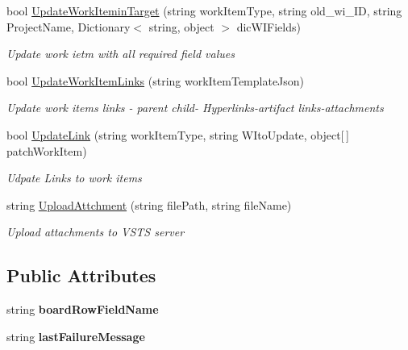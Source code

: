\begin{DoxyCompactItemize}
bool \mbox{\hyperlink{class_vsts_rest_a_p_i_1_1_work_item_and_tracking_1_1_import_work_items_a0287a32144b543656c69fd06131ee7f3}{Update\+Work\+Itemin\+Target}} (string work\+Item\+Type, string old\+\_\+wi\+\_\+\+ID, string Project\+Name, Dictionary$<$ string, object $>$ dic\+W\+I\+Fields)
\begin{DoxyCompactList}\small\item\em Update work ietm with all required field values \end{DoxyCompactList}\item 
bool \mbox{\hyperlink{class_vsts_rest_a_p_i_1_1_work_item_and_tracking_1_1_import_work_items_ad85453d724d643b50b25b2d7f39ba95d}{Update\+Work\+Item\+Links}} (string work\+Item\+Template\+Json)
\begin{DoxyCompactList}\small\item\em Update work items links -\/ parent child-\/ Hyperlinks-\/artifact links-\/attachments \end{DoxyCompactList}\item 
bool \mbox{\hyperlink{class_vsts_rest_a_p_i_1_1_work_item_and_tracking_1_1_import_work_items_a70dc11cc49f3584702b7269d3ed821b2}{Update\+Link}} (string work\+Item\+Type, string W\+Ito\+Update, object\mbox{[}$\,$\mbox{]} patch\+Work\+Item)
\begin{DoxyCompactList}\small\item\em Udpate Links to work items \end{DoxyCompactList}\item 
string \mbox{\hyperlink{class_vsts_rest_a_p_i_1_1_work_item_and_tracking_1_1_import_work_items_a5845172621eec8d4991f3633077dc498}{Upload\+Attchment}} (string file\+Path, string file\+Name)
\begin{DoxyCompactList}\small\item\em Upload attachments to V\+S\+TS server \end{DoxyCompactList}\end{DoxyCompactItemize}
\subsection*{Public Attributes}
\begin{DoxyCompactItemize}
\item 
\mbox{\label{class_vsts_rest_a_p_i_1_1_work_item_and_tracking_1_1_import_work_items_a3c49805a2d5db76c5e891bb58d55b7ff}} 
string {\bfseries board\+Row\+Field\+Name}
\item 
\mbox{\label{class_vsts_rest_a_p_i_1_1_work_item_and_tracking_1_1_import_work_items_a69a6c66655b4eacd36b981b3a140540a}} 
string {\bfseries last\+Failure\+Message}
\end{DoxyCompactItemize}


